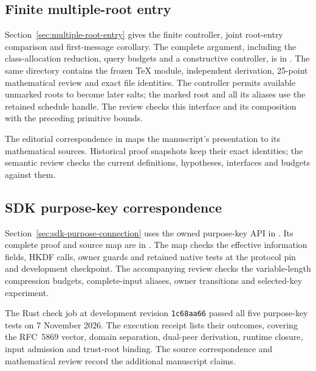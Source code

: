 \documentclass[pdflatex]{sn-jnl}
\theoremstyle{thmstyleone}
\theoremstyle{thmstylethree}
\theoremstyle{thmstyletwo}
\begin{document}
\subsection{Finite multiple-root entry}

Section~\ref{sec:multiple-root-entry} gives the finite controller, joint
root-entry comparison and first-message corollary. The complete argument,
including the class-allocation reduction, query budgets and a constructive
controller, is in
.
The same directory contains the frozen TeX module, independent derivation,
25-point mathematical review and exact file identities. The controller
permits available unmarked roots to become later salts; the marked root and
all its aliases use the retained schedule handle. The review checks this
interface and its composition with the preceding primitive bounds.

The editorial correspondence in 
maps the manuscript's presentation to its mathematical sources. Historical
proof snapshots keep their exact identities; the semantic review checks the
current definitions, hypotheses, interfaces and budgets against them.

\subsection{SDK purpose-key correspondence}

Section~\ref{sec:sdk-purpose-connection} uses the owned purpose-key API in
\href{https://github.com/billlza/q-periapt/blob/228c944fc476e3e57d6c08063cacb19bca5b360e/crates/q-periapt-sdk/src/purpose.rs}{}.
Its complete proof and source map are in
. The map checks the effective
information fields, HKDF calls, owner guards and retained native tests at
the protocol pin and development checkpoint. The accompanying review
checks the variable-length compression budgets, complete-input aliases,
owner transitions and selected-key experiment.

The Rust check job at development revision \texttt{1c68aa66} passed all
five purpose-key tests on 7 November 2026. The execution receipt lists their
outcomes, covering the RFC~5869 vector, domain separation, dual-peer
derivation, runtime closure, input admission and trust-root binding.
The source correspondence and mathematical review record the additional
manuscript claims.
\end{document}
